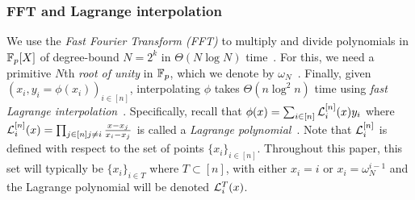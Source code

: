 \subsubsection{FFT and Lagrange interpolation}
\label{s:prelim:fft}
We use the \textit{Fast Fourier Transform (FFT)} to multiply and divide polynomials in $\mathbb{F}_p[X]$ of degree-bound $N = 2^k$ in $\Theta(N\log{N})$ time~\cite{CLRS09,moderncomputeralgebra-ch9}.
For this, we need a primitive $N$th \textit{root of unity} in $\mathbb{F}_p$, which we denote by $\omega_N$~\cite{CLRS09}.
%
%
%
Finally, given $(x_i, y_i = \phi(x_i))_{i\in[n]}$, interpolating $\phi$ takes $\Theta(n\log^2{n})$ time using \textit{fast Lagrange interpolation}~\cite{moderncomputeralgebra-ch10}.
Specifically, recall that $\phi(x)=\sum_{i\in[n]} \mathcal{L}_i^{[n]}(x) y_i$ where $\mathcal{L}_i^{[n]}(x)=\prod_{{j\in[n]\\j\ne i}} \frac{x-x_j}{x_i-x_j}$ is called a \textit{Lagrange polynomial}~\cite{BT04}.
Note that $\mathcal{L}_i^{[n]}$ is defined with respect to the set of points $\{x_i\}_{i\in[n]}$.
Throughout this paper, this set will typically be $\{x_i\}_{i\in T}$ where $T\subset [n]$, with either $x_i = i$ or $x_i = \omega_N^{i-1}$ and the Lagrange polynomial will be denoted $\mathcal{L}_i^T(x)$.


